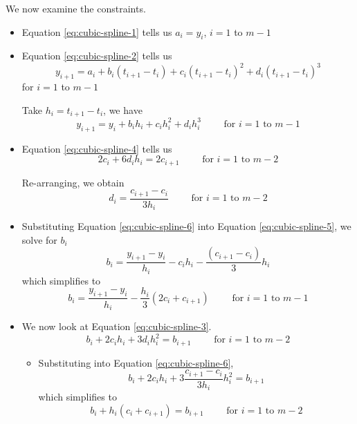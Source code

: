 We now examine the constraints.

\begin{itemize}
    \item Equation \ref{eq:cubic-spline-1} tells us \( a_i = y_i \), \( i = 1 \) to \( m - 1 \)
    \item Equation \ref{eq:cubic-spline-2} tells us \[
              y_{i+1} = a_i + b_i(t_{i+1} - t_i) + c_i(t_{i+1} - t_i)^2 + d_i(t_{i+1} - t_i)^3
          \] for \( i = 1 \) to \( m - 1 \)

          Take \( h_i = t_{i+1} - t_i \), we have \begin{equation}\label{eq:cubic-spline-5}
              y_{i+1} = y_i + b_i h_i + c_i h_i^2 + d_i h_i^3 \qquad \text{ for } i = 1 \text{ to } m - 1
          \end{equation}

    \item Equation \ref{eq:cubic-spline-4} tells us \[
              2 c_i + 6 d_i h_i = 2 c_{i+1} \qquad \text{ for } i = 1 \text{ to } m - 2
          \]

          Re-arranging, we obtain \begin{equation}\label{eq:cubic-spline-6}
              d_i = \frac{c_{i+1} - c_i}{3h_i} \qquad \text{ for } i = 1 \text{ to } m - 2
          \end{equation}

    \item Substituting Equation \ref{eq:cubic-spline-6} into Equation \ref{eq:cubic-spline-5}, we solve for \( b_i \) \[
              b_i = \frac{y_{i+1} - y_i}{h_i} - c_i h_i - \frac{(c_{i+1} - c_i)}{3} h_i
          \] which simplifies to \begin{equation}\label{eq:cubic-spline-7}
              b_i = \frac{y_{i+1} - y_i}{h_i} - \frac{h_i}{3} (2c_i + c_{i+1}) \qquad \text{ for } i = 1 \text{ to } m - 1
          \end{equation}

    \item We now look at Equation \ref{eq:cubic-spline-3}. \[
              b_i + 2c_i h_i + 3d_i h_i^2 = b_{i+1} \qquad \text{ for } i = 1 \text{ to } m - 2
          \]

          \begin{itemize}
              \item
                    Substituting into Equation \ref{eq:cubic-spline-6}, \[
                        b_i + 2c_i h_i + 3 \frac{c_{i+1} - c_i}{3h_i} h_i^2 = b_{i+1}
                    \] which simplifies to \[
                        b_i + h_i (c_i + c_{i+1}) = b_{i+1} \qquad \text{ for } i = 1 \text{ to } m - 2
                    \]


\end{itemize}
\end{itemize}
